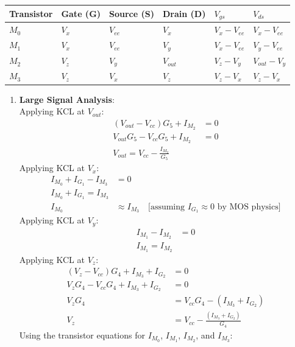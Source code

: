 \begin{tabularx}{\linewidth}{|X|X|X|X|X|X|} \hline
  Transistor & Gate (G) & Source (S) & Drain (D) & $V_{gs}$ & $V_{ds}$ \\ \hline
  $M_0$ & $V_{x}$ & $V_{ee}$ & $V_{x}$ & $V_{x} - V_{ee}$ & $V_{x} - V_{ee}$ \\ \hline
  $M_1$ & $V_{x}$ & $V_{ee}$ & $V_{y}$ & $V_{x} - V_{ee}$ & $V_{y} - V_{ee}$ \\ \hline
  $M_2$ & $V_{z}$ & $V_{y}$ & $V_{out}$ & $V_{z} - V_{y}$ & $V_{out} - V_{y}$ \\ \hline
  $M_3$ & $V_{z}$ & $V_{x}$ & $V_{z}$ & $V_{z} - V_{x}$ & $V_{z} - V_{x}$ \\ \hline
\end{tabularx}

\begin{enumerate}
  \item \textbf{Large Signal Analysis}:\\
    Applying KCL at $V_{out}$:
    \begin{align*}
      (V_{out} - V_{cc})G_5 + I_{M_2} &= 0 \\
      V_{out}G_5 - V_{cc}G_5 + I_{M_2} &= 0 \\
      V_{out} = V_{cc} - \frac{I_{M_2}}{G_5} \tag{1}
    \end{align*}
    Applying KCL at $V_{x}$:
    \begin{align*}
      I_{M_0} + I_{G_1} - I_{M_3} &= 0 \\
      I_{M_0} + I_{G_1} = I_{M_3} \\
      I_{M_0} &\approx I_{M_3} \quad \text{[assuming } I_{G_1} \approx 0 \text{ by MOS physics]} \tag{2}
    \end{align*}
    Applying KCL at $V_{y}$:
    \begin{align*}
      I_{M_1} - I_{M_2} &= 0 \\
      I_{M_1} = I_{M_2} \tag{3}
    \end{align*}
    Applying KCL at $V_{z}$:
    \begin{align*}
      (V_{z} - V_{cc})G_4 + I_{M_3} + I_{G_2} &= 0 \\
      V_{z}G_4 - V_{cc}G_4 + I_{M_3} + I_{G_2} &= 0 \\
      V_{z}G_4 &= V_{cc}G_4 - (I_{M_3} + I_{G_2}) \\
      V_{z} &= V_{cc} - \frac{(I_{M_3} + I_{G_2})}{G_4} \tag{4}
    \end{align*}
    Using the transistor equations for $I_{M_0}$, $I_{M_1}$, $I_{M_2}$, and $I_{M_3}$:

\end{enumerate}
